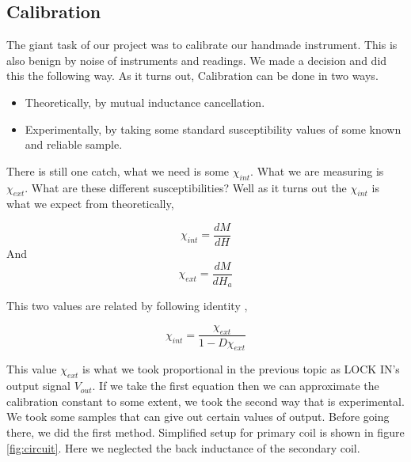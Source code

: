 \subsection{Calibration}


The giant task of our project was to calibrate our handmade instrument. This is also benign by noise of instruments and readings. We made a decision and did this the following way. As it turns out, Calibration can be done in two ways.\cite{cambr} 
\vskip1cm
\begin{itemize}
\item Theoretically, by mutual inductance cancellation. \cite{10.1063/1.1137813}
\vskip1cm
\item Experimentally, by taking some standard susceptibility values of some known and reliable sample.
\end{itemize}
\vskip1cm
There is still one catch, what we need is some $\chi_{int}$\cite{cambr}. What we are measuring is $\chi_{ext}$. What are these different susceptibilities? Well as it turns out the $\chi_{int}$ is what we expect from theoretically, 


\begin{equation*}
\chi_{int} = \frac{dM}{dH}
\end{equation*}
 And 
\begin{equation*}
\chi_{ext} = \frac{dM}{dH_a}
\end{equation*}
 
This two values are related by following identity \cite{cambr},

\begin{equation*}
\chi_{int} = \frac{\chi_{ext}}{1-D\chi_{ext}}
\end{equation*}

This value $\chi_{ext}$ is what we took proportional in the previous topic as LOCK IN’s output signal $V_{out}$. If we take the first equation then we can approximate the calibration constant to some extent, we took the second way that is experimental. We took some samples that can give out certain values of output. Before going there, we did the first method. Simplified setup for primary coil is shown in figure  \ref{fig:circuit}. Here we neglected the back inductance of the secondary coil.

